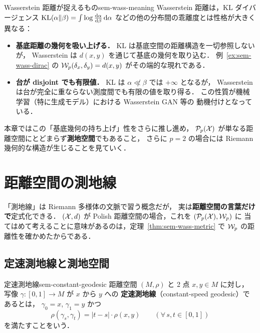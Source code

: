 \begin{remark}{Wasserstein 距離が捉えるもの}{sem-wass-meaning}
  Wasserstein 距離は，KL ダイバージェンス
  $\mathrm{KL}(\alpha \| \beta) = \int \log\frac{\mathrm{d}\alpha}{\mathrm{d}\beta} \, \mathrm{d}\alpha$
  などの他の分布間の乖離度とは性格が大きく異なる：
  \begin{itemize}
    \item \textbf{基底距離の幾何を吸い上げる．}
      KL は基底空間の距離構造を一切参照しないが，
      Wasserstein は $d(x, y)$ を通じて基底の幾何を取り込む．
      例~\ref{ex:sem-wass-dirac} の $\mathcal{W}_p(\delta_x, \delta_y) = d(x, y)$
      がその端的な現れである．
    \item \textbf{台が disjoint でも有限値．}
      KL は $\alpha \not\ll \beta$ では $+\infty$ となるが，
      Wasserstein は台が完全に重ならない測度間でも有限の値を取り得る．
      この性質が機械学習（特に生成モデル）における Wasserstein GAN 等の
      動機付けとなっている．
  \end{itemize}
  本章ではこの「基底幾何の持ち上げ」性をさらに推し進め，
  $\mathcal{P}_p(\mathcal{X})$ が単なる距離空間にとどまらず\textbf{測地空間}でもあること，
  さらに $p = 2$ の場合には Riemann 幾何的な構造が生じることを見ていく．
\end{remark}

\section{距離空間の測地線}
\label{sec:sem-geodesic}

「測地線」は Riemann 多様体の文脈で習う概念だが，
実は\textbf{距離空間の言葉だけで}定式化できる．
$(\mathcal{X}, d)$ が Polish 距離空間の場合，これを $(\mathcal{P}_p(\mathcal{X}), \mathcal{W}_p)$ に
当てはめて考えることに意味があるのは，定理~\ref{thm:sem-wass-metric}
で $\mathcal{W}_p$ の距離性を確かめたからである．

\subsection{定速測地線と測地空間}

\begin{definition}{定速測地線}{sem-constant-geodesic}
  距離空間 $(M, \rho)$ と 2 点 $x, y \in M$ に対し，
  写像 $\gamma \colon [0, 1] \to M$ が $x$ から $y$ への
  \textbf{定速測地線}（constant-speed geodesic）であるとは，
  $\gamma_0 = x$, $\gamma_1 = y$ かつ
  \[
    \rho(\gamma_s, \gamma_t) = |t - s| \cdot \rho(x, y)
    \qquad (\forall\, s, t \in [0, 1])
  \]
  を満たすことをいう．
\end{definition}

